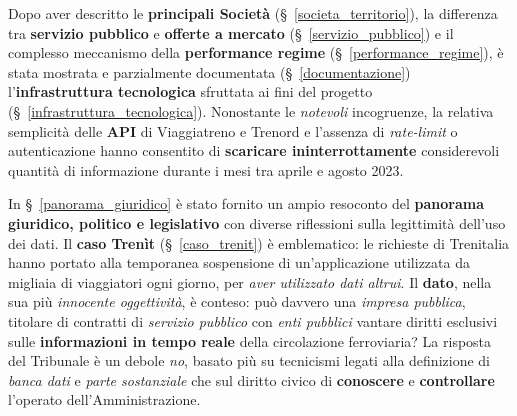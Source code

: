 \documentclass[12pt,italian]{report}
\begin{document}
Dopo aver descritto le \textbf{principali
    Società} (\S~\ref{societa_territorio}), la differenza tra
\textbf{servizio pubblico} e \textbf{offerte a mercato}
(\S~\ref{servizio_pubblico}) e il complesso meccanismo della
\textbf{performance regime} (\S~\ref{performance_regime}), è stata
mostrata e parzialmente documentata (\S~\ref{documentazione})
l'\textbf{infrastruttura tecnologica} sfruttata ai fini del progetto
(\S~\ref{infrastruttura_tecnologica}).  Nonostante le
\textit{notevoli} incogruenze, la relativa semplicità delle
\textbf{API} di Viaggiatreno e Trenord e l'assenza di
\textit{rate-limit} o autenticazione hanno consentito di
\textbf{scaricare ininterrottamente} considerevoli quantità di
informazione durante i mesi tra aprile e agosto 2023.

In \S~\ref{panorama_giuridico} è stato fornito un ampio resoconto del
\textbf{panorama giuridico, politico e legislativo} con diverse
riflessioni sulla legittimità dell'uso dei dati.  Il \textbf{caso
    Trenìt} (\S~\ref{caso_trenit}) è emblematico: le richieste di
Trenitalia hanno portato alla temporanea sospensione di
un'applicazione utilizzata da migliaia di viaggiatori ogni giorno, per
\textit{aver utilizzato dati altrui}.  Il \textbf{dato}, nella sua più
\textit{innocente oggettività}, è conteso: può davvero una
\textit{impresa pubblica}, titolare di contratti di \textit{servizio
    pubblico} con \textit{enti pubblici} vantare diritti esclusivi
sulle \textbf{informazioni in tempo reale} della circolazione
ferroviaria?  La risposta del Tribunale è un debole \textit{no},
basato più su tecnicismi legati alla definizione di \textit{banca
    dati} e \textit{parte sostanziale} che sul diritto civico di
\textbf{conoscere} e \textbf{controllare} l'operato
dell'Amministrazione.
\end{document}
